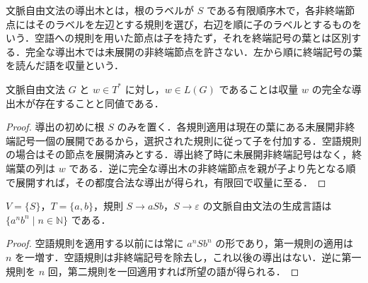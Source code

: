 \begin{defn}[導出木]
文脈自由文法の導出木とは，根のラベルが $S$ である有限順序木で，各非終端節点にはそのラベルを左辺とする規則を選び，右辺を順に子のラベルとするものをいう．空語への規則を用いた節点は子を持たず，それを終端記号の葉とは区別する．完全な導出木では未展開の非終端節点を許さない．左から順に終端記号の葉を読んだ語を収量という．
\end{defn}
\begin{prop}[導出と導出木の同値性]
文脈自由文法 $G$ と $w\in T^*$ に対し，$w\in L(G)$ であることは収量 $w$ の完全な導出木が存在することと同値である．
\end{prop}
\begin{proof}
導出の初めに根 $S$ のみを置く．各規則適用は現在の葉にある未展開非終端記号一個の展開であるから，選択された規則に従って子を付加する．空語規則の場合はその節点を展開済みとする．導出終了時に未展開非終端記号はなく，終端葉の列は $w$ である．逆に完全な導出木の非終端節点を親が子より先となる順で展開すれば，その都度合法な導出が得られ，有限回で収量に至る．
\end{proof}
\begin{prop}[等しい個数の二種類の記号]
$V=\{S\}$，$T=\{a,b\}$，規則 $S\to aSb$，$S\to\varepsilon$ の文脈自由文法の生成言語は $\{a^nb^n\mid n\in\mathbb N\}$ である．
\end{prop}
\begin{proof}
空語規則を適用する以前には常に $a^nSb^n$ の形であり，第一規則の適用は $n$ を一増す．空語規則は非終端記号を除去し，これ以後の導出はない．逆に第一規則を $n$ 回，第二規則を一回適用すれば所望の語が得られる．
\end{proof}

